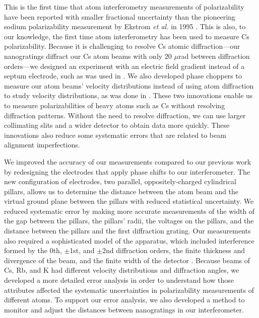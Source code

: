 \documentclass[twocolumn,pra,showpacs,superscriptaddress,longbibliography]{revtex4-1}   %
\newcommand{\etalspace}{\textit{et al. }}
\begin{document}
This is the first time that atom interferometry measurements of polarizability have been reported with smaller fractional uncertainty than the pioneering sodium polarizability measurement by Ekstrom \etalspace in 1995 \cite{Ekstrom1995}.
This is also, to our knowledge, the first time atom interferometry has been used to measure Cs polarizability.
Because it is challenging to resolve Cs atomic diffraction---our nanogratings diffract our Cs atom beams with only 20 $\mu$rad between diffraction orders---we designed an experiment 
with an electric field gradient instead of a septum electrode, such as was used in \cite{Ekstrom1995,Miffre2006}.
We also developed phase choppers \cite{Roberts2002,Roberts2004,Holmgren2011,Hromada2014} to measure our atom beams' velocity distributions instead of 
using atom diffraction to study velocity distributions, as was done in \cite{Ekstrom1995,Holmgren2010}.
These two innovations enable us to measure polarizabilities of heavy atoms such as Cs without resolving diffraction patterns. 
Without the need to resolve diffraction, we can use larger collimating slits and a wider detector to obtain data more quickly. These innovations also reduce some systematic errors that are related to beam alignment imperfections.

We improved the accuracy of our measurements compared to our previous work \cite{Holmgren2010} by redesigning the electrodes that apply phase shifts to our interferometer. 
The new configuration of electrodes, two parallel, oppositely-charged cylindrical pillars, allows us to determine the distance between the atom beam and the virtual ground plane between the pillars with reduced statistical uncertainty. We reduced systematic error by making more accurate measurements of the width of the gap between the pillars, the pillars' radii, the voltages on the pillars, and the distance between the pillars and the first diffraction grating.
Our measurements also required a sophisticated model of the apparatus, which included
interference formed by the 0th, $\pm$1st, and $\pm$2nd diffraction orders, the finite thickness and divergence of the beam, and the finite width of the detector \cite{Hromada2014}.
Because beams of Cs, Rb, and K had different velocity distributions and diffraction angles, we developed a more detailed error analysis in order to understand how those attributes affected the systematic uncertainties in polarizability measurements of different atoms.
To support our error analysis, we also developed a method to monitor and adjust the distances between nanogratings in our interferometer.
\end{document}
